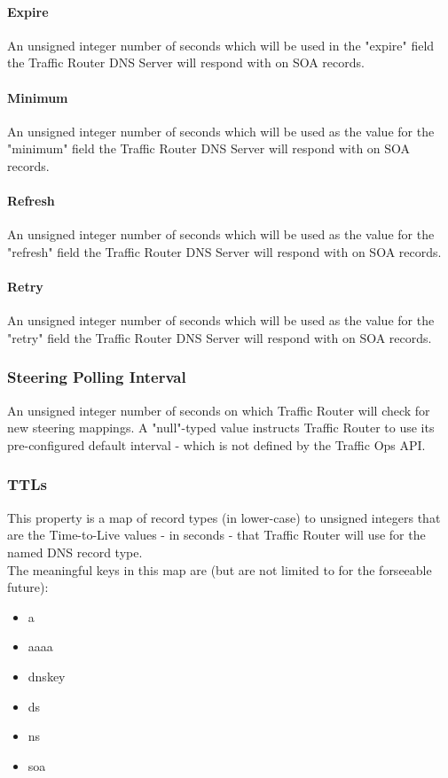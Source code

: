 \paragraph{Expire}
An unsigned integer number of seconds which will be used in the "expire" field
the Traffic Router DNS Server will respond with on SOA records.

\paragraph{Minimum}
An unsigned integer number of seconds which will be used as the value for the
"minimum" field the Traffic Router DNS Server will respond with on SOA records.

\paragraph{Refresh}
An unsigned integer number of seconds which will be used as the value for the
"refresh" field the Traffic Router DNS Server will respond with on SOA records.

\paragraph{Retry}
An unsigned integer number of seconds which will be used as the value for the
"retry" field the Traffic Router DNS Server will respond with on SOA records.

\subsubsection{Steering Polling Interval}
An unsigned integer number of seconds on which Traffic Router will check for new
steering mappings. A "null"-typed value instructs Traffic Router to use its
pre-configured default interval - which is not defined by the Traffic Ops API.

\subsubsection{TTLs}
This property is a map of record types (in lower-case) to unsigned integers that
are the Time-to-Live values - in seconds - that Traffic Router will use for the named
DNS record type.\\
The meaningful keys in this map are (but are not limited to for the forseeable
future):

\begin{itemize}
	\item a
	\item aaaa
	\item dnskey
	\item ds
	\item ns
	\item soa
\end{itemize}

